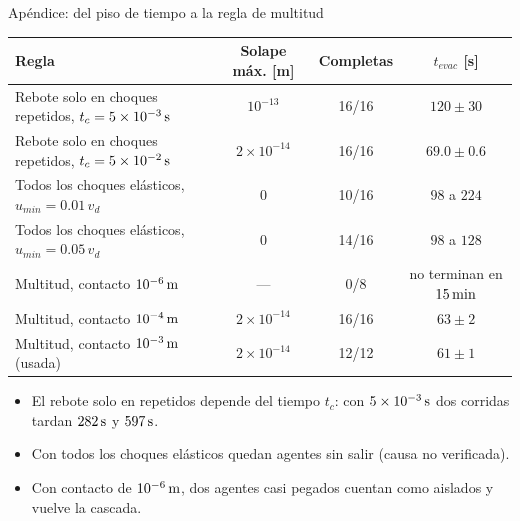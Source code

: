 \begin{frame}{Apéndice: del piso de tiempo a la regla de multitud}
  \footnotesize
  \begin{center}
    \begin{tabular}{lccc}
      \toprule
      Regla & Solape máx. [m] & Completas & $t_{evac}$ [s] \\ \midrule
      Rebote solo en choques repetidos, $t_c = 5\times10^{-3}\,\mathrm{s}$ & $10^{-13}$        & 16/16 & $120\pm30$ \\
      Rebote solo en choques repetidos, $t_c = 5\times10^{-2}\,\mathrm{s}$ & $2\times10^{-14}$ & 16/16 & $69.0\pm0.6$ \\
      Todos los choques elásticos, $u_{min} = 0.01\,v_d$             & $0$               & 10/16 & $98$ a $224$ \\
      Todos los choques elásticos, $u_{min} = 0.05\,v_d$             & $0$               & 14/16 & $98$ a $128$ \\
      Multitud, contacto $10^{-6}\,\mathrm{m}$                             & ---               & 0/8   & no terminan en $15\,\mathrm{min}$ \\
      Multitud, contacto $10^{-4}\,\mathrm{m}$                             & $2\times10^{-14}$ & 16/16 & $63\pm2$ \\
      Multitud, contacto $10^{-3}\,\mathrm{m}$ (usada)                     & $2\times10^{-14}$ & 12/12 & $61\pm1$ \\
      \bottomrule
    \end{tabular}
  \end{center}
  \begin{itemize}
    \item El rebote solo en repetidos depende del tiempo $t_c$: con $5\times10^{-3}\,\mathrm{s}$ dos corridas tardan $282\,\mathrm{s}$ y $597\,\mathrm{s}$.
    \item Con todos los choques elásticos quedan agentes sin salir (causa no verificada).
    \item Con contacto de $10^{-6}\,\mathrm{m}$, dos agentes casi pegados cuentan como aislados y vuelve la cascada.
  \end{itemize}
\end{frame}

